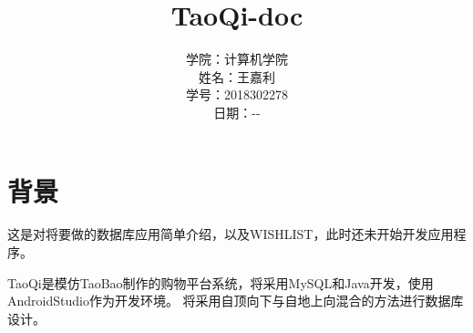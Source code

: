\documentclass[UTF8，12pt, a4paper]{ctexart}
\begin{document}


\renewcommand{\contentsname}{Contents}
\renewcommand{\bibname}{reference}

\renewcommand{\today}{\number\year-\number\month-\number\day}


\title{{\vspace{50pt}\Huge TaoQi-doc\linebreak\linebreak}
\vspace{200pt}
}

\author{ %
\begin{tabular}{lc}
    学院：& 计算机学院 \\\cline{2-2}
    姓名： & 王嘉利 \\ \cline{2-2}
    学号：& 2018302278 \\\cline{2-2}
    日期：&\today \\ \cline{2-2}
\end{tabular}}

\date{}

\maketitle

\newpage


\setcounter{secnumdepth}{4}
\tableofcontents
\newpage

\section{背景}

\begin{shaded}
    {\kaishu 这是对将要做的数据库应用简单介绍，以及WISHLIST，此时还未开始开发应用程序。}
\end{shaded}

TaoQi是模仿TaoBao制作的购物平台系统，将采用MySQL和Java开发，使用AndroidStudio作为开发环境。
将采用自顶向下与自地上向混合的方法进行数据库设计。
\end{document}
